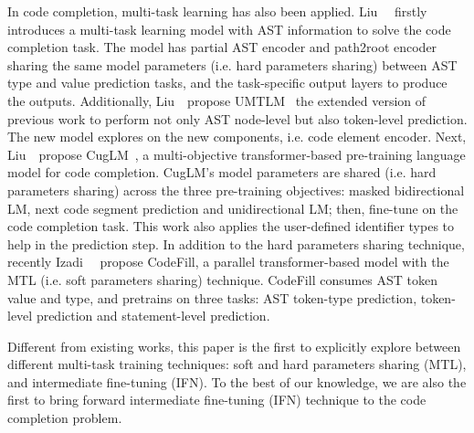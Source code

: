 In code completion, multi-task learning has also been applied.
Liu~\ea~\cite{liu2020self} firstly introduces a multi-task learning model with AST information to solve the code completion task.
The model has partial AST encoder and path2root encoder sharing the same model parameters (i.e. hard parameters sharing) between AST type and value prediction tasks, and the task-specific output layers to produce the outputs.
Additionally, Liu~\ea~propose UMTLM~\cite{liu2022unified} the extended version of previous work to perform not only AST node-level but also token-level prediction.
The new model explores on the new components, i.e. code element encoder.
Next, Liu~\ea~propose CugLM~\cite{liu2020multi}, a multi-objective transformer-based pre-training language model for code completion. 
CugLM's model parameters are shared (i.e. hard parameters sharing) across the three pre-training objectives: masked bidirectional LM, next code segment prediction and unidirectional LM; then, fine-tune on the code completion task.
This work also applies the user-defined identifier types to help in the prediction step.
In addition to the hard parameters sharing technique,
recently Izadi~\ea~\cite{izadi2022codefill} propose CodeFill, a parallel transformer-based model with the MTL (i.e. soft parameters sharing) technique.
CodeFill consumes AST token value and type, and pretrains on three tasks: AST token-type prediction, token-level prediction and statement-level prediction.

Different from existing works, this paper is the first to explicitly explore between different multi-task training techniques: soft and hard parameters sharing (MTL), and intermediate fine-tuning (IFN).
To the best of our knowledge, we are also the first to bring forward intermediate fine-tuning (IFN) technique to the code completion problem.









